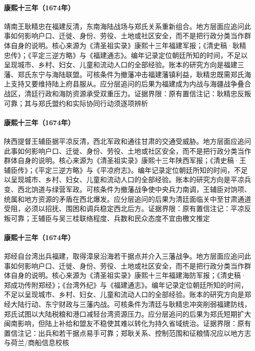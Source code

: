 \hypertarget{social:EQ-1674-GENG-JINGZHONG}{}\paragraph{康熙十三年（1674年）}靖南王耿精忠在福建反清，东南海陆战场与郑氏关系重新组合。地方层面应追问此事如何影响户口、迁徙、身份、劳役、土地或社区安全，而不是把行政分类当作群体自身的说明。核心来源为《清圣祖实录》康熙十三年福建军报；《清史稿·耿精忠传》；《平定三逆方略》与《福建通志》。编年记录定位朝廷所知的时间，不足以呈现城市、乡村、妇女、儿童和流动人口的全部经验。账本的研究方向是福建三藩、郑氏东宁与海陆联盟。可核条件为撤藩冲击福建藩镇利益，耿精忠既需郑氏海上支持又要维持陆上府县服从。应分层追问的后果为福建成为内战与海疆战争叠合战区，清廷行政和海防资源承受双重压力。证据界限：原有置信注记：耿精忠反叛可靠；其与郑氏盟约和实际协同行动须逐项辨析
\hypertarget{social:EQ-1674-WANG-FUCHEN}{}\paragraph{康熙十三年（1674年）}陕西提督王辅臣据平凉反清，西北军政和通往甘肃的交通受威胁。地方层面应追问此事如何影响户口、迁徙、身份、劳役、土地或社区安全，而不是把行政分类当作群体自身的说明。核心来源为《清圣祖实录》康熙十三年陕西军报；《清史稿·王辅臣传》；《平定三逆方略》与《平凉府志》。编年记录定位朝廷所知的时间，不足以呈现城市、乡村、妇女、儿童和流动人口的全部经验。账本的研究方向是平凉兵变、西北饷道与绿营军政。可核条件为撤藩战争使中央兵力南调，王辅臣对饷项、统属和地方资源的矛盾在西北爆发。应分层追问的后果为清廷面临关中至甘肃通道受阻，必须以招抚、围困和调兵稳定西北后方。证据界限：原有置信注记：平凉反叛可靠；王辅臣与吴三桂联络程度、兵数和民众态度不宜由檄文推定
\hypertarget{social:EQ-1674-ZHENG-JING-FUJIAN}{}\paragraph{康熙十三年（1674年）}郑经自台湾出兵福建，取得漳泉沿海若干据点并介入三藩战争。地方层面应追问此事如何影响户口、迁徙、身份、劳役、土地或社区安全，而不是把行政分类当作群体自身的说明。核心来源为《清圣祖实录》康熙十三年福建海防军报；《清史稿·郑成功传附郑经》；《台湾外纪》与《福建通志》。编年记录定位朝廷所知的时间，不足以呈现城市、乡村、妇女、儿童和流动人口的全部经验。账本的研究方向是郑经大陆行动、东宁财政与三藩内战。可核条件为清廷与耿精忠冲突削弱福建防线，郑氏试图以大陆税粮和港口减轻台湾资源压力。应分层追问的后果为郑氏短期扩大闽南影响，但陆上补给和盟友不稳使其难以转化为持久省域统治。证据界限：原有置信注记：出兵和若干据点易手可靠；郑耿关系、控制范围和征粮情况应以地方志与荷兰/商船信息校核
